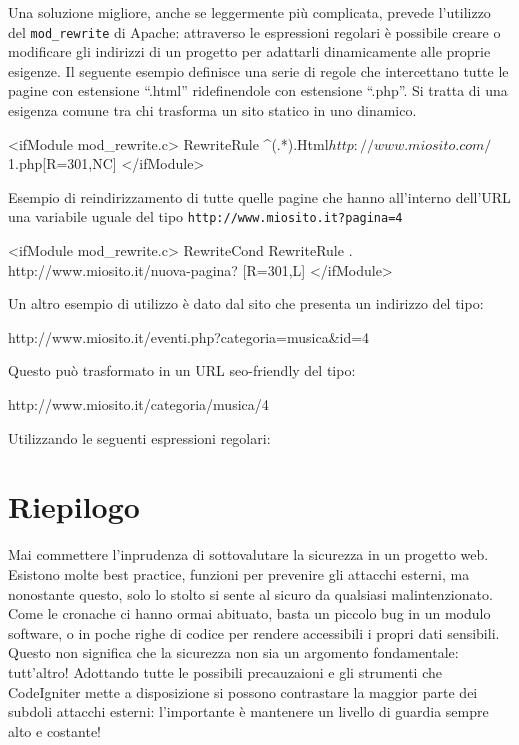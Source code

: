 Una soluzione migliore, anche se leggermente più complicata, prevede l'utilizzo del \verb|mod_rewrite| di Apache: attraverso le espressioni regolari è possibile creare o modificare gli indirizzi di un progetto per adattarli dinamicamente alle proprie esigenze. Il seguente esempio definisce una serie di regole che intercettano tutte le pagine con estensione ``.html'' ridefinendole con estensione ``.php''. Si tratta di una esigenza comune tra chi trasforma un sito statico in uno dinamico.

\begin{code}
<ifModule mod_rewrite.c>
RewriteRule ^(.*).Html$ http://www.miosito.com/$1.php[R=301,NC]
</ifModule>
\end{code}

Esempio di reindirizzamento di tutte quelle pagine che hanno all'interno dell'\ac{URL} una variabile uguale del tipo \verb|http://www.miosito.it?pagina=4|

\begin{code}
<ifModule mod_rewrite.c>
RewriteCond %
RewriteRule . http://www.miosito.it/nuova-pagina? [R=301,L]
</ifModule>
\end{code}

Un altro esempio di utilizzo è dato dal sito che presenta un indirizzo del tipo:  

\begin{code}
http://www.miosito.it/eventi.php?categoria=musica&id=4
\end{code}

Questo può trasformato in un \ac{URL} seo-friendly del tipo:

\begin{code}
http://www.miosito.it/categoria/musica/4
\end{code}

Utilizzando le seguenti espressioni regolari:


\section*{Riepilogo}
Mai commettere l'inprudenza di sottovalutare la sicurezza in un progetto web. Esistono molte best practice, funzioni per prevenire gli attacchi esterni, ma nonostante questo, solo lo stolto si sente al sicuro da qualsiasi malintenzionato. Come le cronache ci hanno ormai abituato, basta un piccolo bug in un modulo software, o in poche righe di codice per rendere accessibili i propri dati sensibili. Questo non significa che la sicurezza non sia un argomento fondamentale: tutt'altro! Adottando tutte le possibili precauzaioni e gli strumenti che CodeIgniter mette a disposizione si possono contrastare la maggior parte dei subdoli attacchi esterni: l'importante è mantenere un livello di guardia sempre alto e costante!